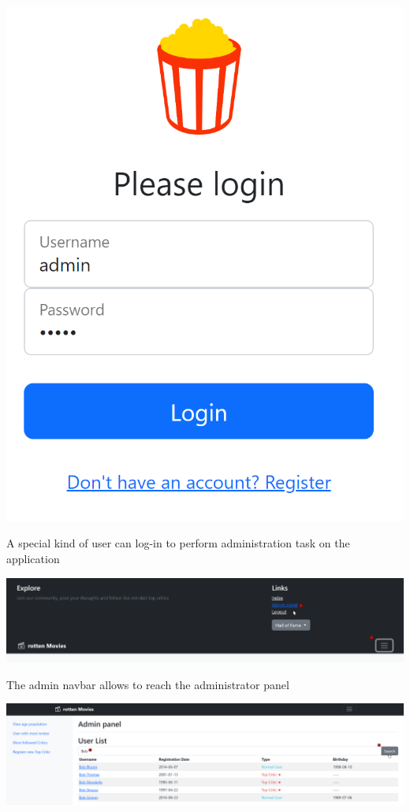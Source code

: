 \includegraphics[scale=0.45]{../../../images/user_manual/admin_login.png} 

A special kind of user can log-in to perform administration task on the application

\includegraphics[scale=0.45]{../../../images/user_manual/admin_navbar.png} 

The admin navbar allows to reach the administrator panel

\includegraphics[scale=0.45]{../../../images/user_manual/admin_panel_search_user.png} 

